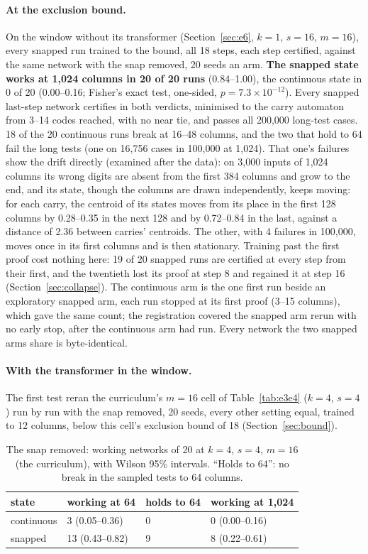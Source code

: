 \documentclass[11pt]{article}
\begin{document}
\paragraph{At the exclusion bound.} On the window without its transformer (Section~\ref{sec:e6},
$k = 1$, $s = 16$, $m = 16$), every snapped run trained to the bound, all 18 steps, each step
certified, against the same network with the snap removed, 20 seeds an arm. \textbf{The snapped
state works at 1{,}024 columns in 20 of 20 runs} (0.84--1.00), the continuous state in 0 of 20
(0.00--0.16; Fisher's exact test, one-sided, $p = 7.3 \times 10^{-12}$). Every snapped last-step
network certifies in both verdicts, minimised to the carry automaton from 3--14 codes reached, with
no near tie, and passes all 200{,}000 long-test cases. 18 of the 20 continuous runs break at
16--48 columns, and the two that hold to 64 fail the long tests (one on 16{,}756 cases in 100{,}000
at 1{,}024). That one's failures show the drift directly (examined after the data): on 3{,}000 inputs of 1{,}024 columns its wrong digits
are absent from the first 384 columns and grow to the end, and its state, though the columns are
drawn independently, keeps moving: for each carry, the centroid of its states moves from its place
in the first 128 columns by 0.28--0.35 in the next 128 and by 0.72--0.84 in the last, against a
distance of 2.36 between carries' centroids. The other, with 4 failures in 100{,}000, moves once in
its first columns and is then stationary. Training past the first proof cost nothing here: 19 of 20 snapped runs are certified at every
step from their first, and the twentieth lost its proof at step 8 and regained it at step 16
(Section~\ref{sec:collapse}). The continuous arm is the one first run beside an exploratory
snapped arm, each run stopped at its first proof (3--15 columns), which gave the same count; the
registration covered the snapped arm rerun with no early stop, after the continuous arm had run.
Every network the two snapped arms share is byte-identical.

\paragraph{With the transformer in the window.} The first test reran the curriculum's $m = 16$
cell of Table~\ref{tab:e3e4} ($k = 4$, $s = 4$) run by run with the snap removed, 20 seeds, every
other setting equal, trained to 12 columns, below this cell's exclusion bound of 18
(Section~\ref{sec:bound}).

\begin{table}[t]
\centering
\caption{The snap removed: working networks of 20 at $k=4$, $s=4$, $m=16$ (the curriculum), with
Wilson 95\% intervals. ``Holds to 64'': no break in the sampled tests to 64 columns.}
\label{tab:e2}
\begin{tabular}{llll}
\toprule
state & working at 64 & holds to 64 & working at 1{,}024 \\
\midrule
continuous & 3 (0.05--0.36) & 0 & 0 (0.00--0.16) \\
snapped & 13 (0.43--0.82) & 9 & 8 (0.22--0.61) \\
\bottomrule
\end{tabular}
\end{table}
\end{document}
